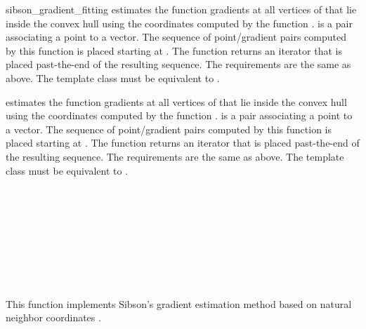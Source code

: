 \begin{ccRefFunction}{sibson_gradient_fitting}
{estimates the function gradients at all vertices of  that lie
  inside the convex hull using the coordinates computed by the
  function .
   is a pair associating a point to a
  vector. The sequence of point/gradient pairs computed by this
  function is placed starting at . The function returns an
  iterator that is placed past-the-end of the resulting sequence. The
  requirements are the same as above. The template class  must
  be equivalent to .}

{estimates the function gradients at all vertices of  that lie
  inside the convex hull using the coordinates computed by the
  function .
   is a pair associating a point to a
  vector. The sequence of point/gradient pairs computed by this
  function is placed starting at . The function returns an
  iterator that is placed past-the-end of the resulting sequence. The
  requirements are the same as above. The template class  must
  be equivalent to .}


\ccSeeAlso
{} \\
 \\
 \\
 \\
 \\
\\
 \\
\\

\ccImplementation This function implements Sibson's gradient
estimation method based on natural neighbor coordinates
\cite{s-bdnni-81}. 

\end{ccRefFunction}


